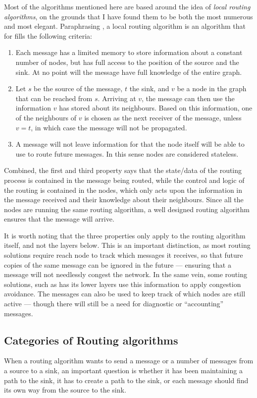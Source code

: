 Most of the algorithms mentioned here are based around the idea of \emph{local routing algorithms}, on the grounds that I have found them to be both the most numerous and most elegant. Paraphrasing \cite{compass}, a local routing algorithm is an algorithm that for fills the following criteria:
\begin{enumerate}
\item Each message has a limited memory to store information about a constant number of nodes, but has full access to the position of the source and the sink. At no point will the message have full knowledge of the entire graph. 
\item Let $s$ be the source of the message, $t$ the sink, and $v$ be a node in the graph that can be reached from $s$. Arriving at $v$, the message can then use the information $v$ has stored about its neighbours. Based on this information, one of the neighbours of $v$ is chosen as the next receiver of the message, unless $v = t$, in which case the message will not be propagated.
\item A message will not leave information for that the node itself will be able to use to route future messages. In this sense nodes are considered stateless.
\end{enumerate}

Combined, the first and third property says that the state/data of the routing process is contained in the message being routed, while the control and logic of the routing is contained in the nodes, which only acts upon the information in the message received and their knowledge about their neighbours. Since all the nodes are running the same routing algorithm, a well designed routing algorithm ensures that the message will arrive.

\label{record-recived}
It is worth noting that the three properties only apply to the routing algorithm itself, and not the layers below. This is an important distinction, as most routing solutions require reach node to track which messages it receives, so that future copies of the same message can be ignored in the future --- ensuring that a message will not needlessly congest the network. In the same vein, some routing solutions, such as \cite{speed} has its lower layers use this information to apply congestion avoidance. The messages can also be used to keep track of which nodes are still active --- though there will still be a need for diagnostic or ``accounting'' messages. 

\subsection{Categories of Routing algorithms}
\label{section:cat_routing}
When a routing algorithm wants to send a message or a number of messages from a source to a sink, an important question is whether it has been maintaining a path to the sink, it has to create a path to the sink, or each message should find its own way from the source to the sink.

